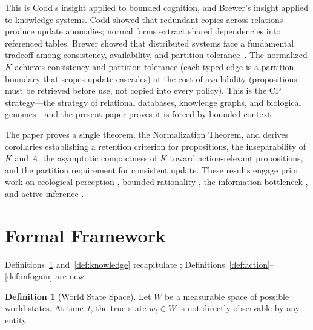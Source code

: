\documentclass[11pt]{article}
\theoremstyle{definition}
\newtheorem{definition}{Definition}
\theoremstyle{remark}
\begin{document}
This is Codd's insight \cite{Codd1970} applied to bounded cognition,
and Brewer's insight \cite{Brewer2000} applied to knowledge systems.
Codd showed that redundant copies across relations produce update
anomalies; normal forms extract shared dependencies into referenced
tables. Brewer showed that distributed systems face a fundamental
tradeoff among consistency, availability, and partition
tolerance~\cite{Gilbert2002}. The normalized $K$ achieves consistency
and partition tolerance (each typed edge is a partition boundary that
scopes update cascades) at the cost of availability (propositions must
be retrieved before use, not copied into every policy). This is the
CP strategy---the strategy of relational databases, knowledge graphs,
and biological genomes---and the present paper proves it is forced by
bounded context.

The paper proves a single theorem, the Normalization Theorem, and
derives corollaries establishing a retention criterion for propositions,
the inseparability of $K$ and $A$, the asymptotic compactness of $K$
toward action-relevant propositions, and the partition requirement for
consistent update. These results engage prior work on
ecological perception \cite{Gibson1979}, bounded rationality
\cite{Simon1955}, the information bottleneck \cite{Tishby2000,
Tishby2011}, and active inference \cite{Friston2010,
ParrPezzuloFriston2022}.

\section{Formal Framework}
\label{sec:framework}

Definitions~\ref{def:world} and~\ref{def:knowledge} recapitulate
\cite{McCarthy2026a}; Definitions~\ref{def:action}--\ref{def:infogain}
are new.

\begin{definition}[World State Space]
\label{def:world}
Let $W$ be a measurable space of possible world states. At time~$t$, the
true state $w_t \in W$ is not directly observable by any entity.
\end{definition}
\end{document}
